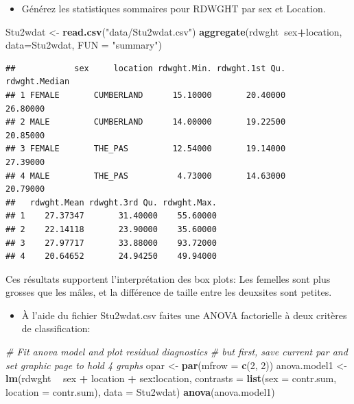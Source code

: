 \documentclass[12pt,]{book}
\newenvironment{Shaded}{\begin{snugshade}}{\end{snugshade}}
\newcommand{\CommentTok}[1]{\textcolor[rgb]{0.56,0.35,0.01}{\textit{#1}}}
\newcommand{\DataTypeTok}[1]{\textcolor[rgb]{0.13,0.29,0.53}{#1}}
\newcommand{\DecValTok}[1]{\textcolor[rgb]{0.00,0.00,0.81}{#1}}
\newcommand{\KeywordTok}[1]{\textcolor[rgb]{0.13,0.29,0.53}{\textbf{#1}}}
\newcommand{\NormalTok}[1]{#1}
\newcommand{\OperatorTok}[1]{\textcolor[rgb]{0.81,0.36,0.00}{\textbf{#1}}}
\newcommand{\StringTok}[1]{\textcolor[rgb]{0.31,0.60,0.02}{#1}}
\providecommand{\tightlist}{%
  \setlength{\itemsep}{0pt}\setlength{\parskip}{0pt}}
\begin{document}
\begin{itemize}
\tightlist
\item
  Générez les statistiques sommaires pour RDWGHT par sex et Location.
\end{itemize}

\begin{Shaded}
\begin{Highlighting}[]
\NormalTok{Stu2wdat <-}\StringTok{ }\KeywordTok{read.csv}\NormalTok{(}\StringTok{"data/Stu2wdat.csv"}\NormalTok{)}
\KeywordTok{aggregate}\NormalTok{(rdwght}\OperatorTok{~}\NormalTok{sex}\OperatorTok{+}\NormalTok{location, }\DataTypeTok{data=}\NormalTok{Stu2wdat, }\DataTypeTok{FUN =} \StringTok{"summary"}\NormalTok{)}
\end{Highlighting}
\end{Shaded}

\begin{verbatim}
##            sex     location rdwght.Min. rdwght.1st Qu. rdwght.Median
## 1 FEMALE       CUMBERLAND      15.10000       20.40000      26.80000
## 2 MALE         CUMBERLAND      14.00000       19.22500      20.85000
## 3 FEMALE       THE_PAS         12.54000       19.14000      27.39000
## 4 MALE         THE_PAS          4.73000       14.63000      20.79000
##   rdwght.Mean rdwght.3rd Qu. rdwght.Max.
## 1    27.37347       31.40000    55.60000
## 2    22.14118       23.90000    35.60000
## 3    27.97717       33.88000    93.72000
## 4    20.64652       24.94250    49.94000
\end{verbatim}

Ces résultats supportent l'interprétation des box plots: Les femelles sont plus grosses que les mâles, et la différence de taille entre les deuxsites sont petites.

\begin{itemize}
\tightlist
\item
  À l'aide du fichier Stu2wdat.csv faites une ANOVA factorielle à
  deux critères de classification:
\end{itemize}

\begin{Shaded}
\begin{Highlighting}[]
\CommentTok{# Fit anova model and plot residual diagnostics}
\CommentTok{# but first, save current par and set graphic page to hold 4 graphs}
\NormalTok{opar <-}\StringTok{ }\KeywordTok{par}\NormalTok{(}\DataTypeTok{mfrow =} \KeywordTok{c}\NormalTok{(}\DecValTok{2}\NormalTok{, }\DecValTok{2}\NormalTok{))}
\NormalTok{anova.model1 <-}\StringTok{ }\KeywordTok{lm}\NormalTok{(rdwght }\OperatorTok{~}\StringTok{ }\NormalTok{sex }\OperatorTok{+}\StringTok{ }\NormalTok{location }\OperatorTok{+}\StringTok{ }\NormalTok{sex}\OperatorTok{:}\NormalTok{location,}
\DataTypeTok{contrasts =} \KeywordTok{list}\NormalTok{(}\DataTypeTok{sex =}\NormalTok{ contr.sum, }\DataTypeTok{location =}\NormalTok{ contr.sum),}
\DataTypeTok{data =}\NormalTok{ Stu2wdat)}
\KeywordTok{anova}\NormalTok{(anova.model1)}
\end{Highlighting}
\end{Shaded}
\end{document}
